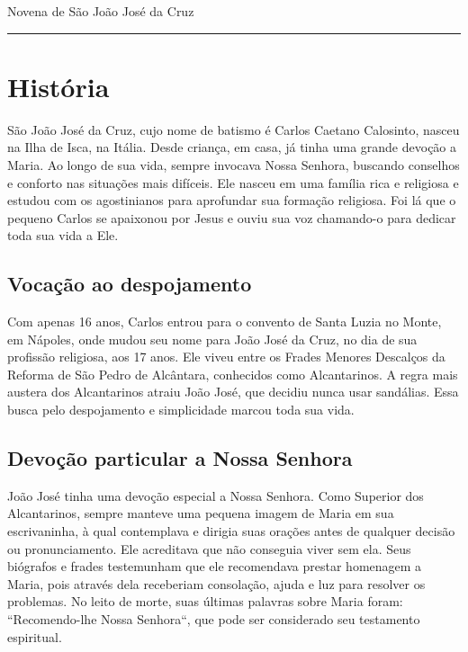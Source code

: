 \documentclass[a4paper,14pt]{extarticle} \usepackage[utf8]{inputenc}
\begin{document}


\begin{center}
  {\huge Novena de São João José da Cruz}
\end{center}



\noindent\rule{\textwidth}{0.4pt}

\tableofcontents

\thispagestyle{empty}


\newpage

\section{História}

São João José da Cruz, cujo nome de batismo é Carlos Caetano Calosinto, nasceu na Ilha de Isca, na Itália. Desde criança, em casa, já tinha uma grande devoção a Maria. Ao longo de sua vida, sempre invocava Nossa Senhora, buscando conselhos e conforto nas situações mais difíceis. Ele nasceu em uma família rica e religiosa e estudou com os agostinianos para aprofundar sua formação religiosa. Foi lá que o pequeno Carlos se apaixonou por Jesus e ouviu sua voz chamando-o para dedicar toda sua vida a Ele.
\subsection{Vocação ao despojamento}

Com apenas 16 anos, Carlos entrou para o convento de Santa Luzia no Monte, em Nápoles, onde mudou seu nome para João José da Cruz, no dia de sua profissão religiosa, aos 17 anos. Ele viveu entre os Frades Menores Descalços da Reforma de São Pedro de Alcântara, conhecidos como Alcantarinos. A regra mais austera dos Alcantarinos atraiu João José, que decidiu nunca usar sandálias. Essa busca pelo despojamento e simplicidade marcou toda sua vida.
\subsection{Devoção particular a Nossa Senhora}

João José tinha uma devoção especial a Nossa Senhora. Como Superior dos Alcantarinos, sempre manteve uma pequena imagem de Maria em sua escrivaninha, à qual contemplava e dirigia suas orações antes de qualquer decisão ou pronunciamento. Ele acreditava que não conseguia viver sem ela. Seus biógrafos e frades testemunham que ele recomendava prestar homenagem a Maria, pois através dela receberiam consolação, ajuda e luz para resolver os problemas. No leito de morte, suas últimas palavras sobre Maria foram: “Recomendo-lhe Nossa Senhora“, que pode ser considerado seu testamento espiritual.
\end{document}
